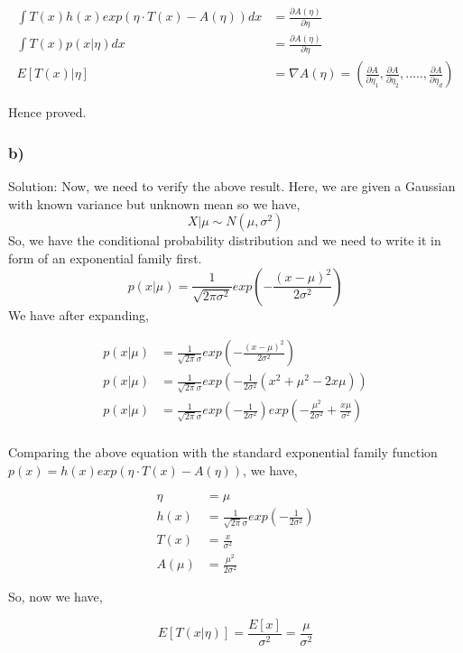 \documentclass[]{article}
\begin{document}
\begin{align*}
   \int T(x)h(x)exp(\eta \cdot T(x) - A(\eta))dx &= \frac{\partial A(\eta)}{\partial \eta} \\
   \int T(x)p(x|\eta) dx &= \frac{\partial A(\eta)}{\partial \eta} \\
   E[T(x)|\eta] &= \nabla A(\eta) = \left(\frac{\partial A}{\partial \eta_1}, \frac{\partial A}{\partial \eta_2}, ....., \frac{\partial A}{\partial \eta_d}\right)
\end{align*}

Hence proved.

\subsubsection{b)}\label{b}

Solution: Now, we need to verify the above result. Here, we are given a
Gaussian with known variance but unknown mean so we have,
\[X | \mu \sim N(\mu, \sigma^2)\] So, we have the conditional
probability distribution and we need to write it in form of an
exponential family
first.\[p(x|\mu) = \frac{1}{\sqrt{2\pi \sigma^2}} exp\left(-\frac{(x - \mu)^2}{2\sigma^2}\right)\]
We have after expanding,

\begin{align*}
    p(x|\mu) &= \frac{1}{\sqrt{2\pi} \sigma} exp\left(-\frac{(x - \mu)^2}{2\sigma^2}\right) \\
    p(x|\mu) &= \frac{1}{\sqrt{2\pi} \sigma} exp\left(-\frac{1}{2\sigma^2}(x^2 + \mu^2 - 2x\mu)\right) \\
    p(x|\mu) &= \frac{1}{\sqrt{2\pi} \sigma} exp\left(-\frac{1}{2\sigma^2}\right)exp\left(-\frac{\mu^2}{2\sigma^2} + \frac{x\mu}{\sigma^2}\right) \\
\end{align*}

Comparing the above equation with the standard exponential family
function \(p(x) = h(x)exp(\eta\cdot T(x) - A(\eta))\), we have,

\begin{align*}
    \eta &= \mu \\
    h(x) &= \frac{1}{\sqrt{2\pi} \sigma}exp\left(-\frac{1}{2\sigma^2}\right) \\
    T(x) &= \frac{x}{\sigma^2} \\
    A(\mu) &= \frac{\mu^2}{2\sigma^2} 
\end{align*}

So, now we have,

\begin{equation}
    E[T(x|\eta)] = \frac{E[x]}{\sigma^2} = \frac{\mu}{\sigma^2}
\end{equation}
\end{document}
